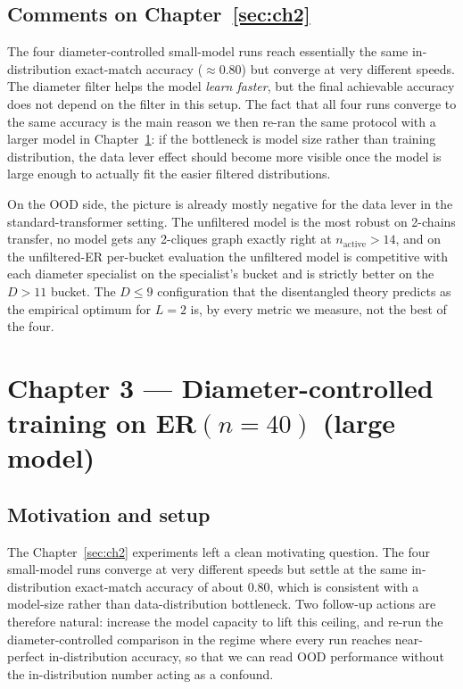 \documentclass[11pt,a4paper]{article}
\begin{document}
\subsection{Comments on Chapter~\ref{sec:ch2}}

The four diameter-controlled small-model runs reach essentially the same
in-distribution exact-match accuracy ($\approx 0.80$) but converge at
very different speeds. The diameter filter helps the model
\emph{learn faster}, but the final achievable accuracy does not depend on
the filter in this setup. The fact that all four runs converge to the
same accuracy is the main reason we then re-ran the same protocol with a
larger model in Chapter~\ref{sec:ch3}: if the bottleneck is model size
rather than training distribution, the data lever effect should become
more visible once the model is large enough to actually fit the easier
filtered distributions.

On the OOD side, the picture is already mostly negative for the data
lever in the standard-transformer setting. The unfiltered model is the
most robust on 2-chains transfer, no model gets any 2-cliques graph
exactly right at $n_{\text{active}} > 14$, and on the unfiltered-ER
per-bucket evaluation the unfiltered model is competitive with each
diameter specialist on the specialist's bucket and is strictly better on
the $D > 11$ bucket. The $D \le 9$ configuration that the disentangled
theory predicts as the empirical optimum for $L = 2$ is, by every metric
we measure, not the best of the four.

\vspace{2em}

\section{Chapter 3 --- Diameter-controlled training on ER$(n = 40)$ (large model)}
\label{sec:ch3}

\subsection{Motivation and setup}

The Chapter~\ref{sec:ch2} experiments left a clean motivating question.
The four small-model runs converge at very different speeds but settle at
the same in-distribution exact-match accuracy of about $0.80$, which is
consistent with a model-size rather than data-distribution bottleneck.
Two follow-up actions are therefore natural: increase the model capacity
to lift this ceiling, and re-run the diameter-controlled comparison in
the regime where every run reaches near-perfect in-distribution accuracy,
so that we can read OOD performance without the in-distribution number
acting as a confound.
\end{document}

